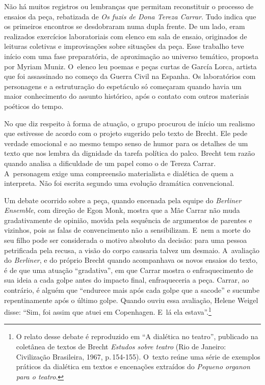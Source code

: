 \subject{Ensaios e projeto cênico}

Não há muitos registros ou lembranças que permitam reconstituir o
processo de ensaios da peça, rebatizada de {\it Os fuzis de Dona Tereza
Carrar}. Tudo indica que os primeiros encontros se desdobraram numa
dupla frente. De um lado, eram realizados exercícios laboratoriais com
elenco em sala de ensaio, originados de leituras coletivas e
improvisações sobre situações da peça. Esse trabalho teve início com uma
fase preparatória, de aproximação ao universo temático, proposta por
Myriam Muniz. O~elenco leu poemas e peças curtas de García Lorca,
artista que foi assassinado no começo da Guerra Civil na Espanha. Os
laboratórios com personagens e a estruturação do espetáculo só começaram
quando havia um maior conhecimento do assunto histórico, após o contato
com outros materiais poéticos do tempo.

No que diz respeito à forma de atuação, o grupo procurou de início um
realismo que estivesse de acordo com o projeto sugerido pelo texto de
Brecht. Ele pede verdade emocional e ao mesmo tempo senso de humor para
os detalhes de um texto que nos lembra da dignidade da tarefa política
do palco. Brecht tem razão quando analisa a dificuldade de um papel como
o de Tereza Carrar. A~personagem exige uma compreensão materialista e
dialética de quem a interpreta. Não foi escrita segundo uma evolução
dramática convencional.

Um debate ocorrido sobre a peça, quando encenada pela equipe do
{\it Berliner Ensemble}, com direção de Egon Monk, mostra que a Mãe
Carrar não muda gradativamente de opinião, movida pela sequência de
argumentos de parentes e vizinhos, pois as falas de convencimento não a
sensibilizam. E~nem a morte do seu filho pode ser considerada o motivo
absoluto da decisão: para uma pessoa petrificada pela recusa, a visão do
corpo causaria talvez um desmaio. A~avaliação do {\it Berliner}, e do próprio
Brecht quando acompanhava os novos ensaios do texto, é de que uma
atuação “gradativa”, em que Carrar mostra o enfraquecimento de sua ideia
a cada golpe antes do impacto final, enfraqueceria a peça. Carrar, ao
contrário, é alguém que “endurece mais após cada golpe que a sacode” e
sucumbe repentinamente após o último golpe. Quando ouviu essa avaliação,
Helene Weigel disse: “Sim, foi assim que atuei em Copenhagen. E~lá ela
estava”.\footnote{O relato desse debate é reproduzido em “A dialética no
  teatro”, publicado na coletânea de textos de Brecht {\it Estudos sobre teatro} (Rio de Janeiro: Civilização Brasileira,
  1967, p.\,154-155). O~texto reúne uma série de exemplos práticos da
  dialética em textos e encenações extraídos do {\it Pequeno organon
  para o teatro}.}

